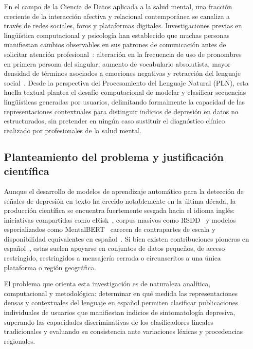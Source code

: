 \documentclass[12pt,a4paper]{article}
\begin{document}
En el campo de la Ciencia de Datos aplicada a la salud mental, una fracción creciente de la interacción afectiva y relacional contemporánea se canaliza a través de redes sociales, foros y plataformas digitales. Investigaciones previas en lingüística computacional y psicología han establecido que muchas personas manifiestan cambios observables en sus patrones de comunicación antes de solicitar atención profesional~\cite{zhang2022nlp,fisher2025metaanalisis}: alteración en la frecuencia de uso de pronombres en primera persona del singular, aumento de vocabulario absolutista, mayor densidad de términos asociados a emociones negativas y retracción del lenguaje social~\cite{rude2004language,almosaiwi2018absolutist}. Desde la perspectiva del Procesamiento del Lenguaje Natural (PLN), esta huella textual plantea el desafío computacional de modelar y clasificar secuencias lingüísticas generadas por usuarios, delimitando formalmente la capacidad de las representaciones contextuales para distinguir indicios de depresión en datos no estructurados, sin pretender en ningún caso sustituir el diagnóstico clínico realizado por profesionales de la salud mental.

\subsection{Planteamiento del problema y justificación científica}
\label{sec:intro_problema}
Aunque el desarrollo de modelos de aprendizaje automático para la detección de señales de depresión en texto ha crecido notablemente en la última década, la producción científica se encuentra fuertemente sesgada hacia el idioma inglés: iniciativas compartidas como eRisk~\cite{losada2017erisk}, corpus masivos como RSDD~\cite{yates2017rsdd} y modelos especializados como MentalBERT~\cite{ji2022mentalbert} carecen de contrapartes de escala y disponibilidad equivalentes en español~\cite{aleman2024pln,mieles2024revision}. Si bien existen contribuciones pioneras en español~\cite{leis2019detecting,coello2019,marmol2024mentalriskes}, estas suelen apoyarse en conjuntos de datos pequeños, de acceso restringido, restringidos a mensajería cerrada o circunscritos a una única plataforma o región geográfica.

El problema que orienta esta investigación es de naturaleza analítica, computacional y metodológica: determinar en qué medida las representaciones densas y contextuales del lenguaje en español permiten clasificar publicaciones individuales de usuarios que manifiestan indicios de sintomatología depresiva, superando las capacidades discriminativas de los clasificadores lineales tradicionales y evaluando su consistencia ante variaciones léxicas y procedencias regionales.
\end{document}
